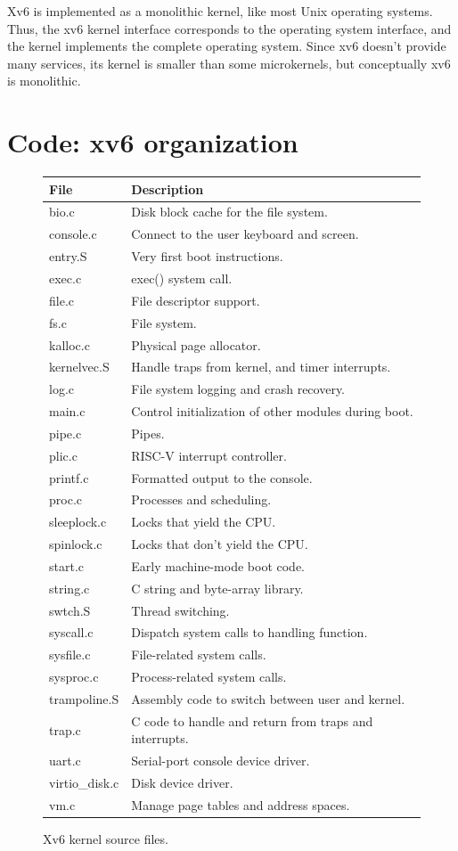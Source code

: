 Xv6 is
implemented as a monolithic kernel, like most Unix operating systems.
Thus, the xv6 kernel interface corresponds to the operating system
interface, and the kernel implements the complete operating system.  Since 
xv6 doesn't provide many services, its kernel is smaller than some
microkernels, but conceptually xv6 is monolithic.

\section{Code: xv6 organization}

\begin{figure}[t]
\center
\begin{tabular}{l|l}
{\bf File} & {\bf Description} \\
\midrule
bio.c & Disk block cache for the file system. \\
console.c & Connect to the user keyboard and screen. \\
entry.S & Very first boot instructions. \\
exec.c & exec() system call. \\
file.c & File descriptor support. \\
fs.c & File system. \\
kalloc.c & Physical page allocator. \\
kernelvec.S & Handle traps from kernel, and timer interrupts. \\
log.c & File system logging and crash recovery. \\
main.c & Control initialization of other modules during boot. \\
pipe.c & Pipes. \\
plic.c & RISC-V interrupt controller. \\
printf.c & Formatted output to the console. \\
proc.c & Processes and scheduling. \\
sleeplock.c & Locks that yield the CPU. \\
spinlock.c & Locks that don't yield the CPU. \\
start.c & Early machine-mode boot code. \\
string.c & C string and byte-array library. \\
swtch.S & Thread switching. \\
syscall.c & Dispatch system calls to handling function. \\
sysfile.c & File-related system calls. \\
sysproc.c & Process-related system calls. \\
trampoline.S & Assembly code to switch between user and kernel. \\
trap.c & C code to handle and return from traps and interrupts. \\
uart.c & Serial-port console device driver. \\
virtio\_disk.c & Disk device driver. \\
vm.c & Manage page tables and address spaces. \\
\end{tabular}
\caption{Xv6 kernel source files.}
\label{fig:source}
\end{figure}


